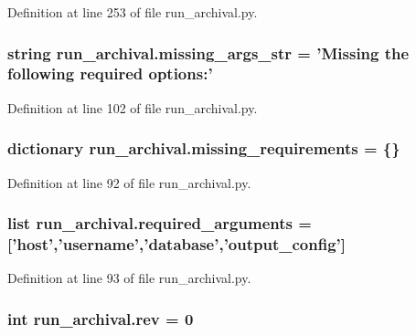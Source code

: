 Definition at line 253 of file run\-\_\-archival.\-py.

\hypertarget{namespacerun__archival_a5770f98d6d8edce5553721e9cb3873fd}{
\subsubsection[{missing\-\_\-args\-\_\-str}]{\setlength{\rightskip}{0pt plus 5cm}string run\-\_\-archival.\-missing\-\_\-args\-\_\-str = 'Missing the following required options\-:'}}\label{namespacerun__archival_a5770f98d6d8edce5553721e9cb3873fd}


Definition at line 102 of file run\-\_\-archival.\-py.

\hypertarget{namespacerun__archival_a4e34d883a21aad086411da12b9df04af}{
\subsubsection[{missing\-\_\-requirements}]{\setlength{\rightskip}{0pt plus 5cm}dictionary run\-\_\-archival.\-missing\-\_\-requirements = \{\}}}\label{namespacerun__archival_a4e34d883a21aad086411da12b9df04af}


Definition at line 92 of file run\-\_\-archival.\-py.

\hypertarget{namespacerun__archival_a4f433eaf745d43b1793399014f83b4d4}{
\subsubsection[{required\-\_\-arguments}]{\setlength{\rightskip}{0pt plus 5cm}list run\-\_\-archival.\-required\-\_\-arguments = \mbox{[}'host','username','database','output\-\_\-config'\mbox{]}}}\label{namespacerun__archival_a4f433eaf745d43b1793399014f83b4d4}


Definition at line 93 of file run\-\_\-archival.\-py.

\hypertarget{namespacerun__archival_a0fe00f8ef6c40a90a1d41ecea3f75e7b}{
\subsubsection[{rev}]{\setlength{\rightskip}{0pt plus 5cm}int run\-\_\-archival.\-rev = 0}}\label{namespacerun__archival_a0fe00f8ef6c40a90a1d41ecea3f75e7b}


